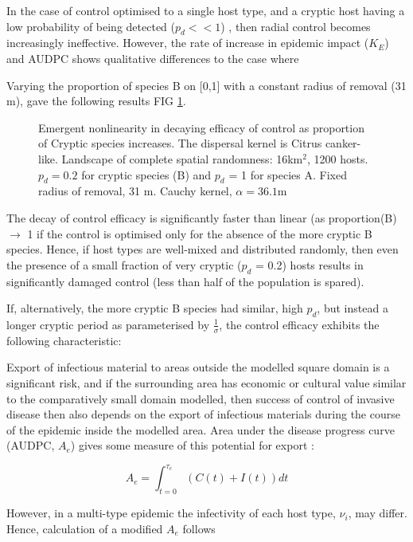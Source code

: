 \documentclass[prstpaper]{revtex4-2}
\begin{document}
In the case of control optimised to a single host type, and a cryptic host having a low probability of being detected ($p_{d} << 1$) , then radial control becomes increasingly ineffective. However, the rate of increase in epidemic impact ($K_{E}$) and AUDPC shows qualitative differences to the case where 

Varying the proportion of species B on [0,1] with a constant radius of removal (31 m), gave the following results FIG \ref{fig5}.

\begin{figure}

\caption{\label{fig5} Emergent nonlinearity in decaying efficacy of control as proportion of Cryptic species increases. The dispersal kernel is Citrus canker-like. Landscape of complete spatial randomness: 16km$^2$, 1200 hosts. $p_{d}  = 0.2$ for cryptic species (B) and $p_d$ = 1 for species A. Fixed radius of removal, 31 m. Cauchy kernel, $\alpha = 36.1$m}
\end{figure}

The decay of control efficacy is significantly faster than linear (as proportion(B) $\rightarrow$ 1 if the control is optimised only for the absence of the more cryptic B species. Hence, if host types are well-mixed and distributed randomly, then even the presence of a small fraction of very cryptic ($p_d$ = 0.2) hosts results in significantly damaged control (less than half of the population is spared). 

If, alternatively, the more cryptic B species had similar, high $p_{d}$, but instead a longer cryptic period as parameterised by $\frac{1}{\sigma}$, the control efficacy exhibits the following characteristic:

Export of infectious material to areas outside the modelled square domain is a significant risk, and if the surrounding area has economic or cultural value similar to the comparatively small domain modelled, then success of control of invasive disease then also depends on the export of infectious materials during the course of the epidemic inside the modelled area. Area under the disease progress curve (AUDPC, $A_{e}$) gives some measure of this potential for export \cite{Cunniffe2015}: 

\begin{equation}
    A_{e} = \int_{t = 0}^{\tau_{e}}\left( C(t) + I(t)\right)  dt  
\end{equation}

However, in a multi-type epidemic the infectivity of each host type, $\nu_{i}$, may differ. Hence, calculation of a modified $A_{e}$ follows
\end{document}
